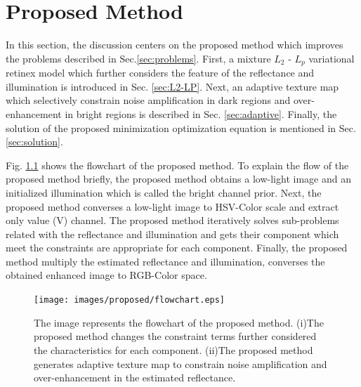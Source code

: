 \chapter{Proposed Method}
\label{sec:proposed}
In this section, the discussion centers on the proposed method which improves the problems described in Sec.\ref{sec:problems}.
First, a mixture $L_{2}$ - $L_{p}$ variational retinex model which further considers the feature of the reflectance and illumination is introduced in Sec. \ref{sec:L2-LP}. 
Next, an adaptive texture map which selectively constrain noise amplification in dark regions and over-enhancement in bright regions is described in Sec. \ref{sec:adaptive}. 
Finally, the solution of the proposed minimization optimization equation is mentioned in Sec. \ref{sec:solution}.\par
Fig. \ref{fig:proposed/flowchart} shows the flowchart of the proposed method.
To explain the flow of the proposed method briefly, the proposed method obtains a low-light image and an initialized illumination which is called the bright channel prior. Next, the proposed method converses a low-light image to HSV-Color scale and extract only value (V) channel. The proposed method iteratively solves sub-problems related with the reflectance and illumination and gets their component which meet the constraints are appropriate for each component. Finally, the proposed method multiply the estimated reflectance and illumination, converses the obtained enhanced image to RGB-Color space.

\begin{figure}[tb]
	\centering
	\texttt{[image: images/proposed/flowchart.eps]}
	\caption{The image represents the flowchart of the proposed method. (i)The proposed method changes the constraint terms further considered the characteristics for each component. (ii)The proposed method generates adaptive texture map to constrain noise  amplification and over-enhancement in the estimated reflectance. } \label{fig:proposed/flowchart}
\end{figure}

